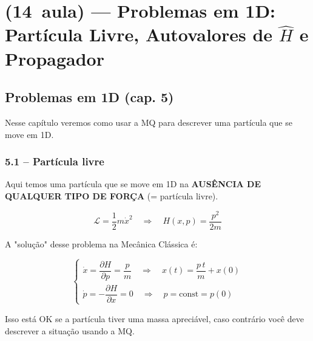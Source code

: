 \section*{(14\textordfeminine\ aula) --- Problemas em 1D: Partícula Livre, Autovalores de $\hat{H}$ e Propagador}

\subsection*{Problemas em 1D (cap. 5)}

Nesse capítulo veremos como usar a MQ para descrever uma partícula que se move em 1D.

\subsubsection*{5.1 -- Partícula livre}

\begin{center}
\end{center}

Aqui temos uma partícula que se move em 1D na \textbf{AUSÊNCIA DE QUALQUER TIPO DE FORÇA} (= partícula livre).

\begin{equation}
    \mathcal{L} = \frac{1}{2}m\dot{x}^2 \quad \Longrightarrow \quad H(x,p) = \frac{p^2}{2m}
\label{eq:aula14_lagrangiana_livre}
\end{equation}

A "solução" desse problema na Mecânica Clássica é:

\begin{equation}
    \begin{cases}
        \dot{x} = \dfrac{\partial H}{\partial p} = \dfrac{p}{m} \quad \Longrightarrow \quad x(t) = \dfrac{p\, t}{m} + x(0) \\[3mm]
        \dot{p} = -\dfrac{\partial H}{\partial x} = 0 \quad \Longrightarrow \quad p = \text{const} = p(0)
    \end{cases}
\label{eq:aula14_solucao_classica}
\end{equation}

Isso está OK se a partícula tiver uma massa apreciável, caso contrário você deve descrever a situação usando a MQ.

